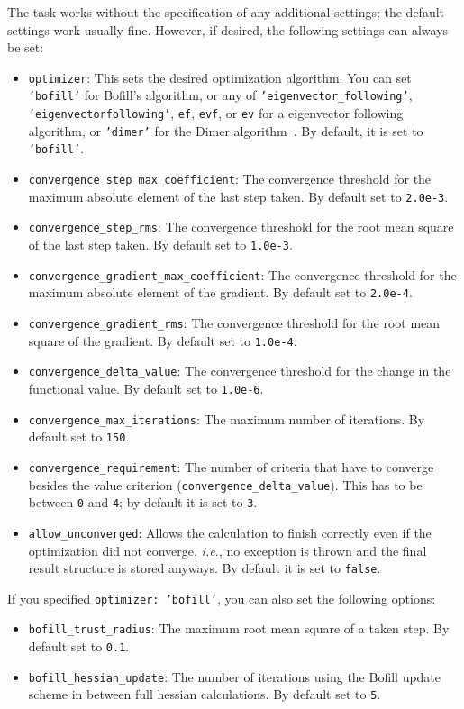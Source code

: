 \documentclass[]{tufte-book}
\begin{document}
The task works without the specification of any additional settings; the default settings work usually fine. However,
if desired, the following settings can always be set:
\begin{itemize}
\item \texttt{optimizer}: This sets the desired optimization algorithm. You can set \texttt{'bofill'} for Bofill's algorithm\cite{bofill1, bofill2},
or any of \texttt{'eigenvector\_following'}, \texttt{'eigenvectorfollowing'}, \texttt{ef}, \texttt{evf}, or \texttt{ev} for a 
eigenvector following algorithm, or \texttt{'dimer'} for the Dimer algorithm~\cite{dimer1,dimer2,dimer3}. By default, it is set to \texttt{'bofill'}.
\item \texttt{convergence\_step\_max\_coefficient}: The convergence threshold for the maximum absolute element of the last step taken.
By default set to \texttt{2.0e-3}.
\item \texttt{convergence\_step\_rms}: The convergence threshold for the root mean square of the last step taken. By default set to 
\texttt{1.0e-3}.
\item \texttt{convergence\_gradient\_max\_coefficient}: The convergence threshold for the maximum absolute element of the gradient. 
By default set to \texttt{2.0e-4}.
\item \texttt{convergence\_gradient\_rms}: The convergence threshold for the root mean square of the gradient. By default set to 
\texttt{1.0e-4}.
\item \texttt{convergence\_delta\_value}: The convergence threshold for the change in the functional value. By default set to
\texttt{1.0e-6}.
\item \texttt{convergence\_max\_iterations}: The maximum number of iterations. By default set to \texttt{150}.
\item \texttt{convergence\_requirement}: The number of criteria that have to converge besides the value criterion 
(\texttt{convergence\_delta\_value}). This has to be between \texttt{0} and \texttt{4}; by default it is set to \texttt{3}.
\item \texttt{allow\_unconverged}: Allows the calculation to finish correctly even if the optimization did not 
converge, \textit{i.e.}, no exception is thrown and the final result structure is stored anyways. By default it is set to \texttt{false}.
\end{itemize}

If you specified \texttt{optimizer: 'bofill'}, you can also set the following options:
\begin{itemize}
\item \texttt{bofill\_trust\_radius}: The maximum root mean square of a taken step. By default set to \texttt{0.1}.
\item \texttt{bofill\_hessian\_update}: The number of iterations using the Bofill update scheme in between full hessian calculations. 
By default set to \texttt{5}.
\end{itemize}
\end{document}
